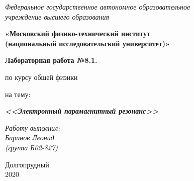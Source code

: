 \thispagestyle{empty}
\begin{center}
    \textit{Федеральное государственное автономное образовательное\\ учреждение высшего образования }

    \vspace{0.5ex}

        \textbf{«Московский физико-технический институт\\ (национальный исследовательский университет)»}
\end{center}

\vspace{10ex}

\begin{center}
    \vspace{13ex}

    \textbf{Лабораторная работа №8.1.}

    \vspace{1ex}

    по курсу общей физики

    на тему:

    \textbf{\textit{<<Электронный парамагнитный резонанс>>}}

    \vspace{30ex}

    \begin{flushright}
        \noindent
        \textit{Работу выполнил:}\\  
        \textit{Баринов Леонид \\(группа Б02-827)}
    \end{flushright}
    \vfill
    Долгопрудный \\2020
\newpage
\setcounter{page}{1}
\fancyhead[R]{\nouppercase{\leftmark}}	
\end{center}
